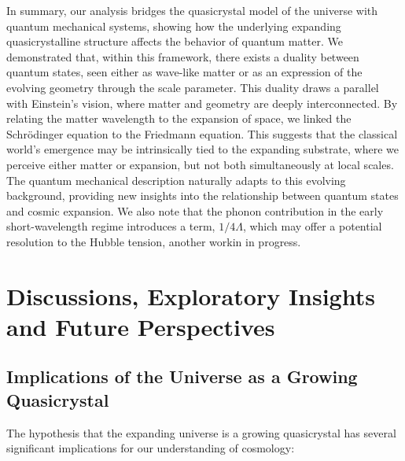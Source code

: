 \documentclass[sn-mathphys-num]{sn-jnl}%
\begin{document}
In summary, our analysis bridges the quasicrystal model of the universe with quantum mechanical systems, showing how the underlying expanding quasicrystalline structure affects the behavior of quantum matter. We demonstrated that, within this framework, there exists a duality between quantum states, seen either as wave-like matter or as an expression of the evolving geometry through the scale parameter. This duality draws a parallel with Einstein's vision, where matter and geometry are deeply interconnected. By relating the matter wavelength to the expansion of space, we linked the Schr{\"o}dinger equation to the Friedmann equation. This suggests that the classical world’s emergence may be intrinsically tied to the expanding substrate, where we perceive either matter or expansion, but not both simultaneously at local scales. The quantum mechanical description naturally adapts to this evolving background, providing new insights into the relationship between quantum states and cosmic expansion.  We also note that the phonon contribution in the early short-wavelength regime introduces a term, $1/4\Lambda$, which may offer a potential resolution to the Hubble tension, another workin in progress.




\section{Discussions, Exploratory Insights and Future Perspectives}
\label{sec:conclusion}

\subsection{Implications of the Universe as a Growing Quasicrystal}

The hypothesis that the expanding universe is a growing quasicrystal has several significant implications for our understanding of cosmology:
\end{document}
